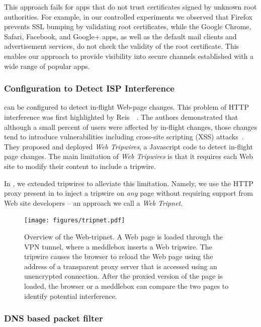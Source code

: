 This approach fails for apps that do not trust certificates signed by unknown root authorities. 
For example, in our controlled experiments we observed that Firefox prevents SSL bumping by validating root certificates, while the Google Chrome, Safari, Facebook, and Google+ apps, as well as the default mail clients and advertisement services, do not check the validity of the root certificate. 
This enables our approach to provide visibility into secure channels established with a wide range of popular apps. 

\subsubsection{Configuration to Detect ISP Interference}

\meddle can be configured to detect in-flight Web-page changes. 
This problem of HTTP interference was first highlighted by Reis~\etal~\cite{reis:tripwires}. 
The authors demonstrated that although a small percent of users were affected by in-flight changes, those changes tend to introduce vulnerabilities including cross-site scripting (XSS) attacks~\cite{reis:tripwires}. 
They proposed and deployed \emph{Web Tripwires}, a Javascript code to detect in-flight page changes. 
The main limitation of \emph{Web Tripwires} is that it requires each Web site to modify their content to include a tripwire.

In \meddle, we extended tripwires to alleviate this limitation. 
Namely, we use the HTTP proxy present in \meddle to inject a tripwire on \emph{any} page without requiring support from Web site developers -- an approach we call a \emph{Web Tripnet}.


\begin{figure}
\centering
\texttt{[image: figures/tripnet.pdf]}
\caption{Overview of the \meddle Web-tripnet. A Web page is loaded
through the VPN tunnel, where a meddlebox inserts a Web tripwire. The
tripwire causes the browser to reload the Web page using the address of a
transparent proxy server that is accessed using an unencrypted connection.
After the proxied version of the page is loaded, the browser or a meddlebox
can compare the two pages to identify potential interference. }
\label{fig:tripnet}
\end{figure}

\subsubsection{DNS based packet filter}

